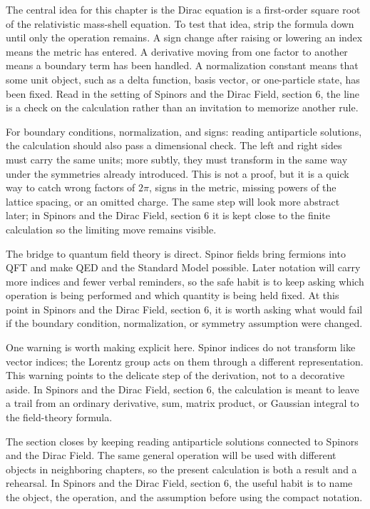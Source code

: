 The central idea for this chapter is the Dirac equation is a first-order square root of the relativistic mass-shell equation.  To test that idea, strip the formula down until only the operation remains.  A sign change after raising or lowering an index means the metric has entered.  A derivative moving from one factor to another means a boundary term has been handled.  A normalization constant means that some unit object, such as a delta function, basis vector, or one-particle state, has been fixed.  Read in the setting of Spinors and the Dirac Field, section 6, the line is a check on the calculation rather than an invitation to memorize another rule.

For boundary conditions, normalization, and signs: reading antiparticle solutions, the calculation should also pass a dimensional check.  The left and right sides must carry the same units; more subtly, they must transform in the same way under the symmetries already introduced.  This is not a proof, but it is a quick way to catch wrong factors of \(2\pi\), signs in the metric, missing powers of the lattice spacing, or an omitted charge.  The same step will look more abstract later; in Spinors and the Dirac Field, section 6 it is kept close to the finite calculation so the limiting move remains visible.

The bridge to quantum field theory is direct.  Spinor fields bring fermions into QFT and make QED and the Standard Model possible.  Later notation will carry more indices and fewer verbal reminders, so the safe habit is to keep asking which operation is being performed and which quantity is being held fixed.  At this point in Spinors and the Dirac Field, section 6, it is worth asking what would fail if the boundary condition, normalization, or symmetry assumption were changed.

One warning is worth making explicit here.  Spinor indices do not transform like vector indices; the Lorentz group acts on them through a different representation.  This warning points to the delicate step of the derivation, not to a decorative aside.  In Spinors and the Dirac Field, section 6, the calculation is meant to leave a trail from an ordinary derivative, sum, matrix product, or Gaussian integral to the field-theory formula.

The section closes by keeping reading antiparticle solutions connected to Spinors and the Dirac Field.  The same general operation will be used with different objects in neighboring chapters, so the present calculation is both a result and a rehearsal.  In Spinors and the Dirac Field, section 6, the useful habit is to name the object, the operation, and the assumption before using the compact notation.



